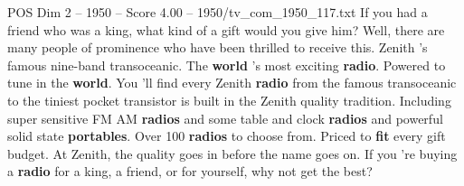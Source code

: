 \begin{textsample}{POS Dim 2 – 1950 – Score 4.00 – 1950/tv\_com\_1950\_117.txt}  \label{ex:f2_pos_010}
If you had a friend who was a king, what kind of a gift would you give him?
Well, there are many people of prominence who have been thrilled to receive this.
Zenith 's famous nine-band transoceanic.
The \textbf{world} 's most exciting \textbf{radio}.
Powered to tune in the \textbf{world}.
You 'll find every Zenith \textbf{radio} from the famous transoceanic to the tiniest pocket transistor is built in the Zenith quality tradition.
Including super sensitive FM AM \textbf{radios} and some table and clock \textbf{radios} and powerful solid state \textbf{portables}.
Over 100 \textbf{radios} to choose from.
Priced to \textbf{fit} every gift budget.
At Zenith, the quality goes in before the name goes on.
If you 're buying a \textbf{radio} for a king, a friend, or for yourself, why not get the best?

\end{textsample}
